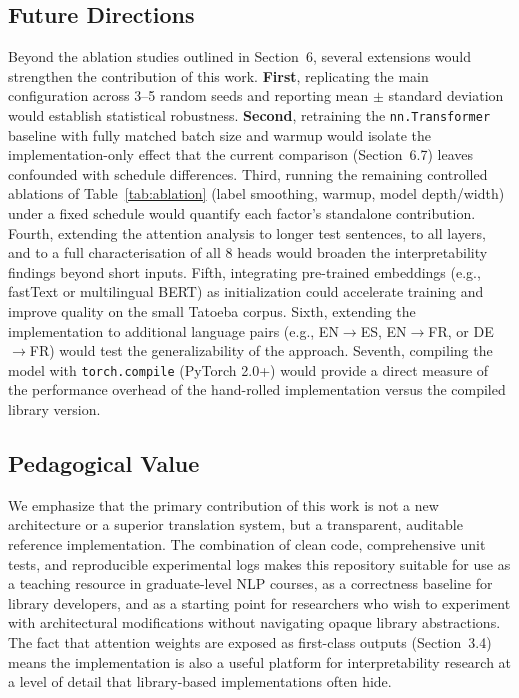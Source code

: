 \subsection{Future Directions}

Beyond the ablation studies outlined in Section~6, several extensions would strengthen the contribution of this work. \textbf{First}, replicating the main configuration across 3--5 random seeds and reporting mean $\pm$ standard deviation would establish statistical robustness. \textbf{Second}, retraining the \texttt{nn.Transformer} baseline with fully matched batch size and warmup would isolate the implementation-only effect that the current comparison (Section~6.7) leaves confounded with schedule differences. Third, running the remaining controlled ablations of Table~\ref{tab:ablation} (label smoothing, warmup, model depth/width) under a fixed schedule would quantify each factor's standalone contribution. Fourth, extending the attention analysis to longer test sentences, to all layers, and to a full characterisation of all 8 heads would broaden the interpretability findings beyond short inputs. Fifth, integrating pre-trained embeddings (e.g., fastText or multilingual BERT) as initialization could accelerate training and improve quality on the small Tatoeba corpus. Sixth, extending the implementation to additional language pairs (e.g., EN$\rightarrow$ES, EN$\rightarrow$FR, or DE$\rightarrow$FR) would test the generalizability of the approach. Seventh, compiling the model with \texttt{torch.compile} (PyTorch 2.0+) would provide a direct measure of the performance overhead of the hand-rolled implementation versus the compiled library version.

\subsection{Pedagogical Value}

We emphasize that the primary contribution of this work is not a new architecture or a superior translation system, but a transparent, auditable reference implementation. The combination of clean code, comprehensive unit tests, and reproducible experimental logs makes this repository suitable for use as a teaching resource in graduate-level NLP courses, as a correctness baseline for library developers, and as a starting point for researchers who wish to experiment with architectural modifications without navigating opaque library abstractions. The fact that attention weights are exposed as first-class outputs (Section~3.4) means the implementation is also a useful platform for interpretability research at a level of detail that library-based implementations often hide.
